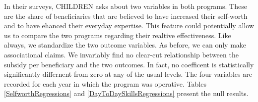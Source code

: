 \documentclass[12pt, a4paper, titlepage]{article}\usepackage[]{graphicx}\usepackage[]{color}
\begin{document}
In their surveys, CHILDREN asks about two variables in both programs. These are the share of beneficiaries that are believed to have increased their self-worth and to have ehanced their everyday expertise. This feature could potentially allow us to compare the two programs regarding their realtive effectiveness. Like always, we standardize the two outcome variables. As before, we can only make associational claims. We invariably find no clear-cut relationship between the subsidy per beneficiary and the two outcomes. In fact, no coefficent is statistically significantly differnent from zero at any of the usual levels. 
The four variables are recorded for each year in which the program was operative.
Tables \ref{SelfworthRegressions} and \ref{DayToDaySkillsRegressions} present the null results. 


\begin{table}
\begin{center}
\caption{Regression Results: Selfworth}
\label{SelfworthRegressions}
\end{center}
\end{table}
\end{document}

